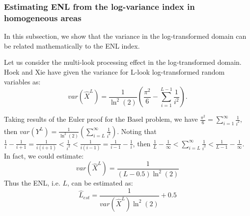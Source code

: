 \subsubsection{ Estimating ENL from the log-variance index in homogeneous areas }
\label{sec:homogeneous_theoretical}

In this subsection, we show that the variance in the log-transformed domain can be related mathematically to the ENL 
index.

Let us consider the multi-look processing effect in the log-transformed domain. 
Hoek \cite{Hoekman_1991_TGRS} and Xie \cite{Xie_2002_TGRS} have given the variance for L-look log-transformed random 
variables as: 
\begin{equation}
var(\hat{X}^L)= \frac{1}{\ln^2(2)} \left( \frac{\pi^2}{6} - \sum^{L-1}_{i=1}{\frac{1}{i^2}} \right).
\label{eqn:perf_index_theoretical}
\end{equation}

Taking results of the Euler proof for the Basel problem, we have $\frac{\pi^2}{6} = \sum^{\infty}_{i=1}{ \frac{1}{i^2} } $, then $var(Y^L)= \frac{1}{\ln^2(2)} \left( \sum^{\infty}_{i=L}{ \frac{1}{i^2} } \right) $.
Noting that $ \frac{1}{i} - \frac{1}{i+1} = \frac{1}{i(i+1)} < \frac{1}{i^2} < \frac{1}{i(i-1)} = \frac{1}{i-1} - \frac{1}{i}$, then $ \frac{1}{L} - \frac{1}{\infty} < \sum^{\infty}_{i=L}{ \frac{1}{i^2} }  < \frac{1}{L-1} - \frac{1}{\infty} $.
In fact, we could estimate:
\begin{equation}
  var(\hat{X}^L) = \frac{1}{(L-0.5) \ln^2(2) }
\label{eqn:perf_index_analytic}
\end{equation}
Thus the ENL, i.e. $L$, can be estimated as:
\begin{equation}
\hat{L}_{est} = \frac{1}{var(\hat{X}^L) \ln^2(2)} + 0.5
\label{eqn:enl_analytic}
\end{equation}

